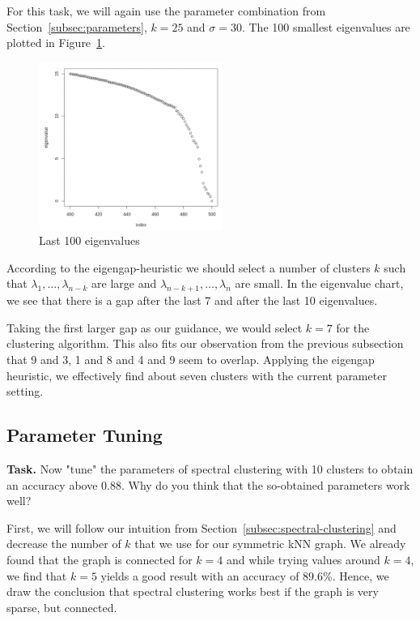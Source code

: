 \documentclass{support/acm_proc_article-sp}
\begin{document}
    For this task, we will again use the parameter combination from
    Section~\ref{subsec:parameters}, $k = 25$ and $\sigma = 30$.
    The 100 smallest eigenvalues are plotted in Figure~\ref{fig:3c-eigenvalues}.
    \begin{figure}[htbp]
        \centering
        \includegraphics[width=6cm]{images/3c-eigenvalues.png}
        \caption{Last 100 eigenvalues}
        \label{fig:3c-eigenvalues}
    \end{figure}
    According to the eigengap-heuristic we should select a number of clusters $k$ such that
    $\lambda_1,\ldots,\lambda_{n-k}$ are large and $\lambda_{n - k + 1},\ldots,\lambda_n$ are small.
    In the eigenvalue chart, we see that there is a gap after the last 7 and after the last 10 eigenvalues.

    Taking the first larger gap as our guidance, we would select $k = 7$ for the clustering algorithm.
    This also fits our observation from the previous subsection that 9 and 3, 1 and 8 and 4 and 9 seem to overlap.
    Applying the eigengap heuristic, we effectively find about seven clusters with the current parameter setting.


    \subsection{Parameter Tuning}
    \label{subsec:parameter-tuning}

    \textbf{Task.} Now "tune" the parameters of spectral clustering with 10 clusters to obtain an accuracy
    above 0.88.
    Why do you think that the so-obtained parameters work well?

    First, we will follow our intuition from Section~\ref{subsec:spectral-clustering} and decrease the
    number of $k$ that we use for our symmetric kNN graph.
    We already found that the graph is connected for $k = 4$ and while trying values around $k = 4$, we find
    that $k = 5$ yields a good result with an accuracy of $89.6\%$.
    Hence, we draw the conclusion that spectral clustering works best if the graph is very sparse,
    but connected.
\end{document}
